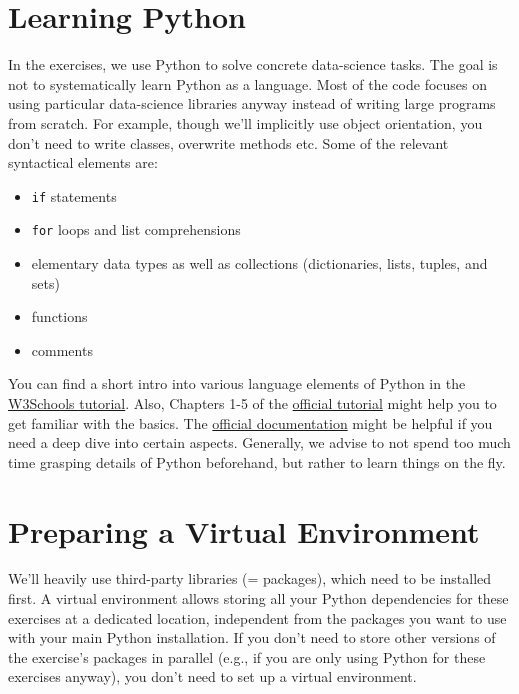 \documentclass[12pt]{article}
\newcommand{\code}[1]{\textcolor{kitgreen}{\texttt{#1}}}
\begin{document}
\section{Learning Python}

In the exercises, we use Python to solve concrete data-science tasks.
The goal is not to systematically learn Python as a language.
Most of the code focuses on using particular data-science libraries anyway instead of writing large programs from scratch.
For example, though we'll implicitly use object orientation, you don't need to write classes, overwrite methods etc.
Some of the relevant syntactical elements are:

\begin{itemize}[left=0pt, noitemsep]
	\item \code{if} statements
	\item \code{for} loops and list comprehensions
	\item elementary data types as well as collections (dictionaries, lists, tuples, and sets)
	\item functions
	\item comments
\end{itemize}

You can find a short intro into various language elements of Python in the \href{https://www.w3schools.com/python/default.asp}{W3Schools tutorial}.
Also, Chapters 1-5 of the \href{https://docs.python.org/3.8/tutorial/index.html}{official tutorial} might help you to get familiar with the basics.
The \href{https://docs.python.org/3.8/}{official documentation} might be helpful if you need a deep dive into certain aspects.
Generally, we advise to not spend too much time grasping details of Python beforehand, but rather to learn things on the fly.

\section{Preparing a Virtual Environment}
\label{sec:environment}

We'll heavily use third-party libraries (= packages), which need to be installed first.
A virtual environment allows storing all your Python dependencies for these exercises at a dedicated location, independent from the packages you want to use with your main Python installation.
If you don't need to store other versions of the exercise's packages in parallel (e.g., if you are only using Python for these exercises anyway), you don't need to set up a virtual environment.
\end{document}
